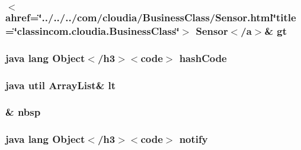 \hypertarget{_sensors_list_adapter_8html_aad64e630bab1a992ddc6a0aa39811222}{
\subsubsection[{gt}]{\setlength{\rightskip}{0pt plus 5cm}$<$ahref=\char`\"{}../../../com/cloudia/Business\-Class/Sensor.\-html\char`\"{}title=\char`\"{}classincom.\-cloudia.\-Business\-Class\char`\"{}$>$ Sensor$<$/{\bf a}$>$\& gt}}\label{_sensors_list_adapter_8html_aad64e630bab1a992ddc6a0aa39811222}
\hypertarget{_sensors_list_adapter_8html_a8e178e2bb2bef055ea23ea3910a221ca}{
\subsubsection[{hash\-Code}]{\setlength{\rightskip}{0pt plus 5cm}java lang Object$<$/h3$>$$<$code$>$ hash\-Code}}\label{_sensors_list_adapter_8html_a8e178e2bb2bef055ea23ea3910a221ca}
\hypertarget{_sensors_list_adapter_8html_a6046ea68583de5557b637104e82142fd}{
\subsubsection[{lt}]{\setlength{\rightskip}{0pt plus 5cm}java util Array\-List\& lt}}\label{_sensors_list_adapter_8html_a6046ea68583de5557b637104e82142fd}
\hypertarget{_sensors_list_adapter_8html_aef915316f784c9063d942974538301a6}{
\subsubsection[{nbsp}]{\setlength{\rightskip}{0pt plus 5cm}\& nbsp}}\label{_sensors_list_adapter_8html_aef915316f784c9063d942974538301a6}
\hypertarget{_sensors_list_adapter_8html_ae99ae10b5010594dbda4794e02db271b}{
\subsubsection[{notify}]{\setlength{\rightskip}{0pt plus 5cm}java lang Object$<$/h3$>$$<$code$>$ notify}}\label{_sensors_list_adapter_8html_ae99ae10b5010594dbda4794e02db271b}
